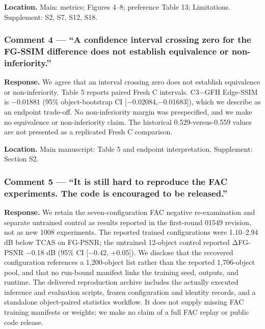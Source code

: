 \documentclass[
  10pt,
]{article}
\begin{document}
\textbf{Location.} Main: metrics; Figures 4--8; preference Table 13;
Limitations. Supplement: S2, S7, S12, S18.

\hypertarget{comment-4-a-confidence-interval-crossing-zero-for-the-fg-ssim-difference-does-not-establish-equivalence-or-non-inferiority.}{%
\subsubsection{Comment 4 --- ``A confidence interval crossing zero for
the FG-SSIM difference does not establish equivalence or
non-inferiority.''}\label{comment-4-a-confidence-interval-crossing-zero-for-the-fg-ssim-difference-does-not-establish-equivalence-or-non-inferiority.}}

\textbf{Response.} We agree that an interval crossing zero does not
establish equivalence or non-inferiority. Table 5 reports paired Fresh C
intervals. C3−GFH Edge-SSIM is −0.01881 (95\% object-bootstrap CI
{[}−0.02084,−0.01683{]}), which we describe as an endpoint trade-off. No
non-inferiority margin was prespecified, and we make no equivalence or
non-inferiority claim. The historical 0.529-versus-0.559 values are not
presented as a replicated Fresh C comparison.

\textbf{Location.} Main manuscript: Table 5 and endpoint interpretation.
Supplement: Section S2.

\hypertarget{comment-5-it-is-still-hard-to-reproduce-the-fac-experiments.-the-code-is-encouraged-to-be-released.}{%
\subsubsection{Comment 5 --- ``It is still hard to reproduce the FAC
experiments. The code is encouraged to be
released.''}\label{comment-5-it-is-still-hard-to-reproduce-the-fac-experiments.-the-code-is-encouraged-to-be-released.}}

\textbf{Response.} We retain the seven-configuration FAC negative
re-examination and separate untrained control as results reported in the
first-round 01549 revision, not as new 1008 experiments. The reported
trained configurations were 1.10--2.94 dB below TCAS on FG-PSNR; the
untrained 12-object control reported ΔFG-PSNR −0.18 dB (95\% CI
{[}−0.42, +0.05{]}). We disclose that the recovered configuration
references a 1,200-object list rather than the reported 1,706-object
pool, and that no run-bound manifest links the training seed, outputs,
and runtime. The delivered reproduction archive includes the actually
executed inference and evaluation scripts, frozen configuration and
identity records, and a standalone object-paired statistics workflow. It
does not supply missing FAC training manifests or weights; we make no
claim of a full FAC replay or public code release.
\end{document}
